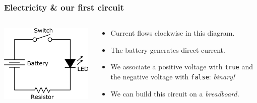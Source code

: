 \documentclass{beamer}
\begin{document}
\begin{frame}
  \frametitle{Electricity \& our first circuit}

  \begin{columns}
    \begin{column}{0.5\textwidth}
      \begin{center}
        \includegraphics[width=\textwidth]{res/led-diagram.png}
      \end{center}
    \end{column}
    \begin{column}{0.5\textwidth}
      \begin{itemize}
        \item Current flows clockwise in this diagram.
        \item The battery generates direct current.
        \item We associate a positive voltage with \texttt{true} and the
          negative voltage with \texttt{false}: \emph{binary!}
        \item We can build this circuit on a \emph{breadboard.}
      \end{itemize}
    \end{column}
  \end{columns}
\end{frame}
\end{document}
